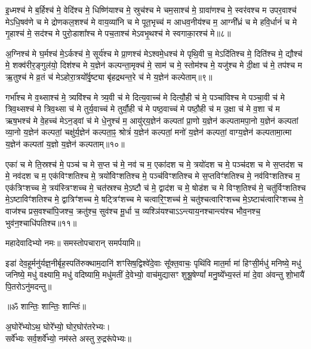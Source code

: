 इ॒ध्मश्च॑ मे ब॒र्हिश्च॑ मे॒ वेदि॑श्च मे॒ धिष्णि॑याश्च मे॒ स्रुच॑श्च मे चम॒साश्च॑ मे॒ ग्रावा॑णश्च मे॒ स्वर॑वश्च म उपर॒वाश्च॑ मेऽधि॒षव॑णे च मे द्रोणकल॒शश्च॑ मे वाय॒व्या॑नि च मे पूत॒भृच्च॑ म आधव॒नीय॑श्च म॒ आग्नी᳚ध्रं च मे हवि॒र्धानं॑ च मे गृ॒हाश्च॑ मे॒ सद॑श्च मे पुरो॒डाशा᳚श्च मे पच॒ताश्च॑ मेऽवभृ॒थश्च॑ मे स्वगाका॒रश्च॑ मे॥८॥ 

अ॒ग्निश्च॑ मे घ॒र्मश्च॑ मे॒ऽर्कश्च॑ मे॒ सूर्य॑श्च मे प्रा॒णश्च॑ मेऽश्वमे॒धश्च॑ मे पृथि॒वी च॒ मेऽदि॑तिश्च मे॒ दिति॑श्च मे॒ द्यौश्च॑ मे॒ शक्व॑रीर॒ङ्गुल॑यो॒ दिश॑श्च मे य॒ज्ञेन॑ कल्पन्ता॒मृक्च॑ मे॒ साम॑ च मे॒ स्तोम॑श्च मे॒ यजु॑श्च मे दी॒क्षा च॑ मे॒ तप॑श्च म ऋ॒तुश्च॑ मे व्र॒तं च॑ मेऽहोरा॒त्रयो᳚र्वृ॒ष्ट्या बृ॑हद्रथन्त॒रे च॑ मे य॒ज्ञेन॑ कल्पेताम्॥९॥ 

गर्भा᳚श्च मे व॒थ्साश्च॑ मे॒ त्र्यवि॑श्च मे त्र्य॒वी च॑ मे दित्य॒वाच्च॑ मे दित्यौ॒ही च॑ मे॒ पञ्चा॑विश्च मे पञ्चा॒वी च॑ मे त्रिव॒थ्सश्च॑ मे त्रिव॒थ्सा च॑ मे तुर्य॒वाच्च॑ मे तुर्यौ॒ही च॑ मे पष्ठ॒वाच्च॑ मे पष्ठौ॒ही च॑ म उ॒क्षा च॑ मे व॒शा च॑ म ऋष॒भश्च॑ मे वे॒हच्च॑ मेऽन॒ड्वां च॑ मे धे॒नुश्च॑ म॒ आयु॑र्‌य॒ज्ञेन॑ कल्पतां प्रा॒णो य॒ज्ञेन॑ कल्पतामपा॒नो य॒ज्ञेन॑ कल्पतां व्या॒नो य॒ज्ञेन॑ कल्पतां॒ चक्षु॑र्य॒ज्ञेन॑ कल्पता॒ꣴ॒ श्रोत्रं॑ य॒ज्ञेन॑ कल्पतां॒ मनो॑ य॒ज्ञेन॑ कल्पतां॒ वाग्य॒ज्ञेन॑ कल्पतामा॒त्मा य॒ज्ञेन॑ कल्पतां य॒ज्ञो य॒ज्ञेन॑ कल्पताम्॥१०॥ 

एका॑ च मे ति॒स्रश्च॑ मे॒ पञ्च॑ च मे स॒प्त च॑ मे॒ नव॑ च म॒ एका॑दश च मे॒ त्रयो॑दश च मे॒ पञ्च॑दश च मे स॒प्तद॑श च मे॒ नव॑दश च म॒ एक॑विꣳशतिश्च मे॒ त्रयो॑विꣳशतिश्च मे॒ पञ्च॑विꣳशतिश्च मे स॒प्तविꣳ॑शतिश्च मे॒ नव॑विꣳशतिश्च म॒ एक॑त्रिꣳशच्च मे॒ त्रय॑स्त्रिꣳशच्च मे॒ चत॑स्रश्च मे॒ऽष्टौ च॑ मे॒ द्वाद॑श च मे॒ षोड॑श च मे विꣳश॒तिश्च॑ मे॒ चतु॑र्विꣳशतिश्च मे॒ऽष्टाविꣳ॑शतिश्च मे॒ द्वात्रिꣳ॑शच्च मे॒ षट्त्रिꣳ॑शच्च मे चत्वारि॒ꣳ॒शच्च॑ मे॒ चतु॑श्चत्वारिꣳशच्च मे॒ऽष्टाच॑त्वारिꣳशच्च मे॒ वाज॑श्च प्रस॒वश्चा॑पि॒जश्च॒ क्रतु॑श्च॒ सुव॑श्च मू॒र्धा च॒ व्यश्ञि॑यश्चा\-ऽऽन्त्याय॒नश्चान्त्य॑श्च भौव॒नश्च॒ भुव॑न॒श्चाधि॑पतिश्च॥११॥ 

महादेवादिभ्यो नमः॥ समस्तोपचारान् समर्पयामि॥

इडा॑ देव॒हूर्मनु॑र्यज्ञ॒नीर्बृह॒स्पति॑रुक्थाम॒दानि॑ शꣳसिष॒द्विश्वे॑दे॒वाः सू᳚क्त॒वाचः॒ पृथि॑वि मात॒र्मा मा॑ हिꣳसी॒र्मधु॑ मनिष्ये॒ मधु॑ जनिष्ये॒ मधु॑ वक्ष्यामि॒ मधु॑ वदिष्यामि॒ मधु॑मतीं दे॒वेभ्यो॒ वाच॑मुद्यासꣳ शुश्रू॒षेण्यां᳚ मनु॒ष्ये᳚भ्य॒स्तं मा॑ दे॒वा अ॑वन्तु शो॒भायै॑ पि॒तरोऽनु॑मदन्तु॥ 

\centerline{॥ॐ शान्तिः॒ शान्तिः॒ शान्तिः॑॥}

{\small\closesection}

अ॒घोरे᳚भ्योऽथ॒ घोरे᳚भ्यो॒ घोर॒घोर॑तरेभ्यः।\\
सर्वे᳚भ्यः सर्व॒शर्वे᳚भ्यो॒ नम॑स्ते अस्तु रु॒द्ररू॑पेभ्यः॥

